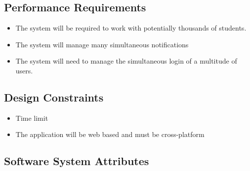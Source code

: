 \documentclass[a4paper,12pt]{article}
\begin{document}
        \subsection{Performance Requirements}
        \begin{itemize}
        \item The system will be required to work with potentially thousands of students.
        \item The system will manage many simultaneous notifications
        \item The system will need to manage the simultaneous login of a multitude of users.
        \end{itemize}
        
        \subsection{Design Constraints}
        \begin{itemize}
        \item Time limit
        \item The application will be web based and must be cross-platform
        \end{itemize}
        
        \subsection{Software System Attributes}
        
\end{document}
